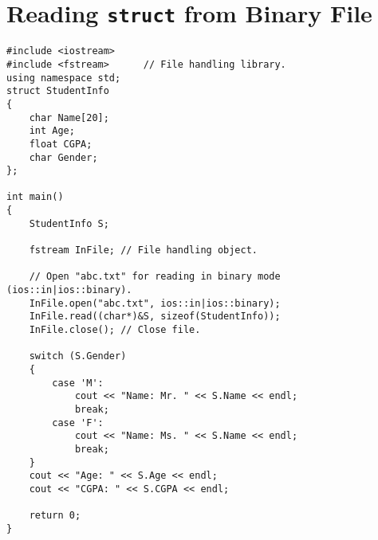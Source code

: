 \documentclass[12pt,a4paper]{article}
\begin{document}
\section{Reading \texttt{struct} from Binary File}
\begin{lstlisting}[caption={Reading a \texttt{struct} from Binary file}]
#include <iostream>
#include <fstream>		// File handling library.
using namespace std;
struct StudentInfo
{
	char Name[20];
	int Age;
	float CGPA;
	char Gender;
};

int main()
{
	StudentInfo S;

	fstream InFile;	// File handling object.

	// Open "abc.txt" for reading in binary mode (ios::in|ios::binary).
	InFile.open("abc.txt", ios::in|ios::binary);
	InFile.read((char*)&S, sizeof(StudentInfo));
	InFile.close();	// Close file.

	switch (S.Gender)
	{
		case 'M':
			cout << "Name: Mr. " << S.Name << endl;
			break;
		case 'F':
			cout << "Name: Ms. " << S.Name << endl;
			break;
	}
	cout << "Age: " << S.Age << endl;
	cout << "CGPA: " << S.CGPA << endl;

	return 0;
}
\end{lstlisting}
\end{document}
